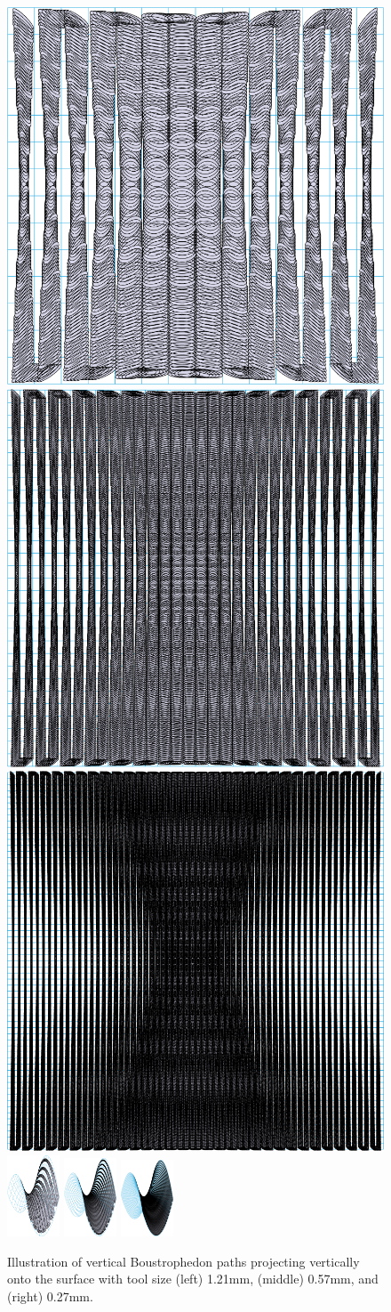 \documentclass[lettersize,journal]{IEEEtran}
\begin{document}
\begin{figure}[t]
\centering
\includegraphics[height=0.14\textwidth]{figures/new_saddle/boust_vertical/sparse_top}
\includegraphics[height=0.14\textwidth]{figures/new_saddle/boust_vertical/middle_top}
\includegraphics[height=0.14\textwidth]{figures/new_saddle/boust_vertical/dense_top}
\includegraphics[width=0.14\textwidth]{figures/new_saddle/boust_vertical/sparse}
\includegraphics[width=0.14\textwidth]{figures/new_saddle/boust_vertical/middle}
\includegraphics[width=0.14\textwidth]{figures/new_saddle/boust_vertical/dense}
\caption{
Illustration of vertical Boustrophedon paths projecting vertically onto the surface with tool size (left) 1.21mm, (middle) 0.57mm, and (right) 0.27mm. 
}\label{fig:exp_boust_vertical}
\end{figure}
\end{document}
